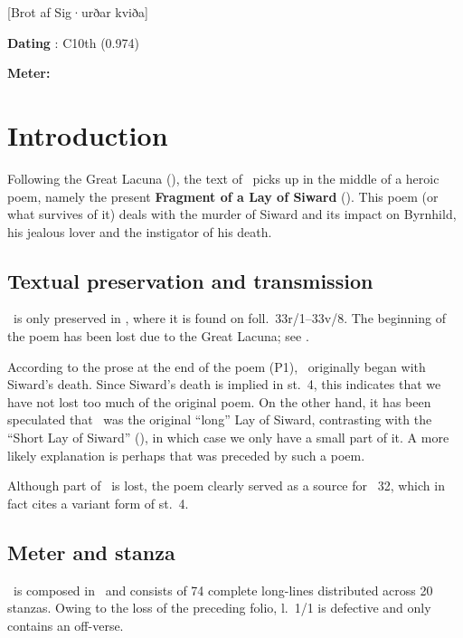 [Brot af Sig·urðar kviða]

\begin{flushright}%
\textbf{Dating} \parencite{Sapp2022}: C10th (0.974)

\textbf{Meter:} \Fornyrdislag%
\end{flushright}

\section{Introduction}

Following the Great Lacuna (), the text of \Regius\ picks up in the middle of a heroic poem, namely the present \textbf{Fragment of a Lay of Siward} (\Brot).  This poem (or what survives of it) deals with the murder of Siward and its impact on Byrnhild, his jealous lover and the instigator of his death.

\subsection{Textual preservation and transmission}

\Brot\ is only preserved in \Regius, where it is found on foll.~33r/1--33v/8.  The beginning of the poem has been lost due to the Great Lacuna; see .

According to the prose at the end of the poem (P1), \Brot\ originally began with Siward’s death.  Since Siward’s death is implied in st.~4, this indicates that we have not lost too much of the original poem.  On the other hand, it has been speculated that \Brot\ was the original “long” Lay of Siward, contrasting with the “Short Lay of Siward” (), in which case we only have a small part of it.  A more likely explanation is perhaps that  was preceded by such a poem.

Although part of \Brot\ is lost, the poem clearly served as a source for \VolsungaSaga\ 32, which in fact cites a variant form of st.~4.

\subsection{Meter and stanza}

\Brot\ is composed in \Fornyrdislag\ and consists of 74 complete long-lines distributed across 20 stanzas.  Owing to the loss of the preceding folio, l.~1/1 is defective and only contains an off-verse.


